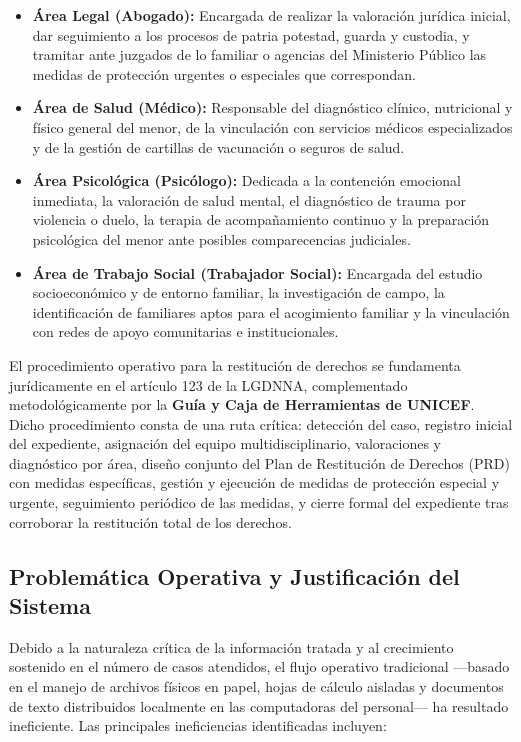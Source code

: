 \begin{itemize}
	\item \textbf{Área Legal (Abogado):} Encargada de realizar la valoración jurídica inicial, dar seguimiento a los procesos de patria potestad, guarda y custodia, y tramitar ante juzgados de lo familiar o agencias del Ministerio Público las medidas de protección urgentes o especiales que correspondan.
	\item \textbf{Área de Salud (Médico):} Responsable del diagnóstico clínico, nutricional y físico general del menor, de la vinculación con servicios médicos especializados y de la gestión de cartillas de vacunación o seguros de salud.
	\item \textbf{Área Psicológica (Psicólogo):} Dedicada a la contención emocional inmediata, la valoración de salud mental, el diagnóstico de trauma por violencia o duelo, la terapia de acompañamiento continuo y la preparación psicológica del menor ante posibles comparecencias judiciales.
	\item \textbf{Área de Trabajo Social (Trabajador Social):} Encargada del estudio socioeconómico y de entorno familiar, la investigación de campo, la identificación de familiares aptos para el acogimiento familiar y la vinculación con redes de apoyo comunitarias e institucionales.
\end{itemize}

El procedimiento operativo para la restitución de derechos se fundamenta jurídicamente en el artículo 123 de la LGDNNA, complementado metodológicamente por la \textbf{Guía y Caja de Herramientas de UNICEF}. Dicho procedimiento consta de una ruta crítica: detección del caso, registro inicial del expediente, asignación del equipo multidisciplinario, valoraciones y diagnóstico por área, diseño conjunto del Plan de Restitución de Derechos (PRD) con medidas específicas, gestión y ejecución de medidas de protección especial y urgente, seguimiento periódico de las medidas, y cierre formal del expediente tras corroborar la restitución total de los derechos.

\subsection{Problemática Operativa y Justificación del Sistema}
Debido a la naturaleza crítica de la información tratada y al crecimiento sostenido en el número de casos atendidos, el flujo operativo tradicional —basado en el manejo de archivos físicos en papel, hojas de cálculo aisladas y documentos de texto distribuidos localmente en las computadoras del personal— ha resultado ineficiente. Las principales ineficiencias identificadas incluyen:

